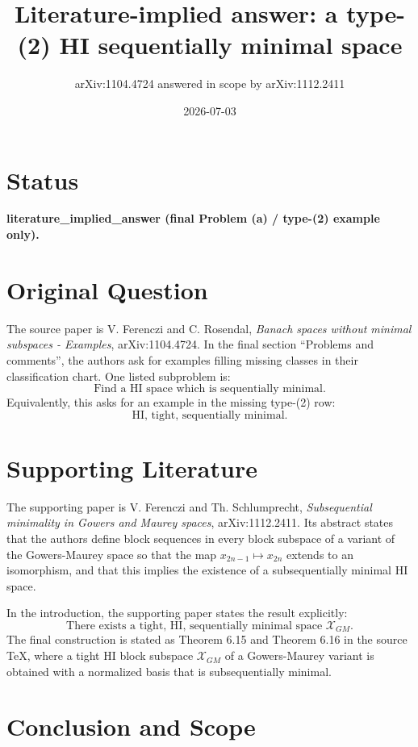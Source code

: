 \documentclass[11pt]{article}
\title{Literature-implied answer: a type-(2) HI sequentially minimal space}
\author{arXiv:1104.4724 answered in scope by arXiv:1112.2411}
\date{2026-07-03}
\begin{document}
\maketitle

\section*{Status}

\textbf{literature\_implied\_answer (final Problem (a) / type-(2) example only).}

\section*{Original Question}

The source paper is V. Ferenczi and C. Rosendal, \emph{Banach spaces without
minimal subspaces - Examples}, arXiv:1104.4724.  In the final section
``Problems and comments'', the authors ask for examples filling missing
classes in their classification chart.  One listed subproblem is:
\[
  \text{Find a HI space which is sequentially minimal.}
\]
Equivalently, this asks for an example in the missing type-(2) row:
\[
  \text{HI, tight, sequentially minimal.}
\]

\section*{Supporting Literature}

The supporting paper is V. Ferenczi and Th. Schlumprecht,
\emph{Subsequential minimality in Gowers and Maurey spaces},
arXiv:1112.2411.  Its abstract states that the authors define block sequences
in every block subspace of a variant of the Gowers-Maurey space so that the
map \(x_{2n-1}\mapsto x_{2n}\) extends to an isomorphism, and that this
implies the existence of a subsequentially minimal HI space.

In the introduction, the supporting paper states the result explicitly:
\[
  \text{There exists a tight, HI, sequentially minimal space } \mathcal X_{GM}.
\]
The final construction is stated as Theorem 6.15 and Theorem 6.16 in the
source TeX, where a tight HI block subspace \(\mathcal X_{GM}\) of a
Gowers-Maurey variant is obtained with a normalized basis that is
subsequentially minimal.

\section*{Conclusion and Scope}
\end{document}
